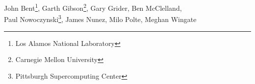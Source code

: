     John Bent\thanks{Los Alamos National Laboratory},
    Garth Gibson\thanks{Carnegie Mellon University},
    Gary Grider\footnotemark[1],
    Ben McClelland\footnotemark[1],
    \\
    Paul Nowoczynski\thanks{Pittsburgh Supercomputing Center},
    James Nunez\footnotemark[1],
    Milo Polte\footnotemark[2],
    Meghan Wingate\footnotemark[1]
\fi
\date{}
\maketitle
\thispagestyle{empty}
\pagestyle{empty}
